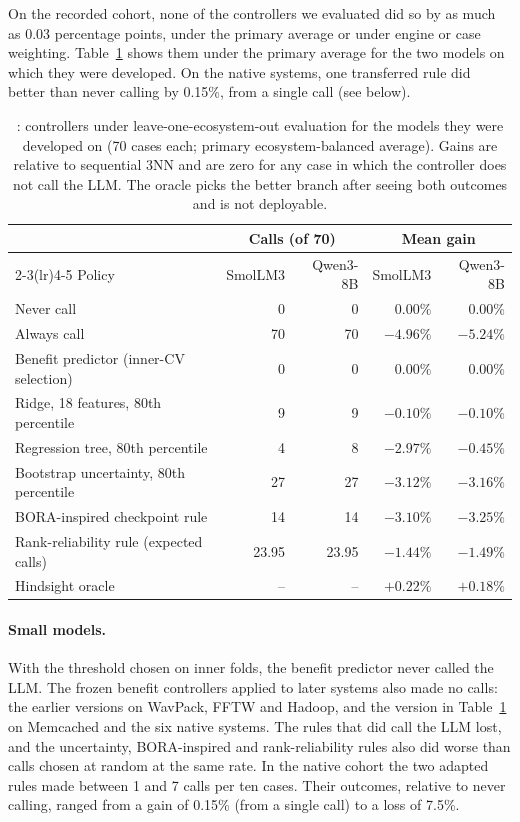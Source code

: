 On the recorded cohort, none of the controllers we evaluated did so by as much as 0.03 percentage points, under the primary average or under engine or case weighting. Table~\ref{tab:rq4} shows them under the primary average for the two models on which they were developed. On the native systems, one transferred rule did better than never calling by 0.15\%, from a single call (see below).

\begin{table}[t]
\centering
\caption{: controllers under leave-one-ecosystem-out evaluation for the models they were developed on (70 cases each; primary ecosystem-balanced average). Gains are relative to sequential 3NN and are zero for any case in which the controller does not call the LLM. The oracle picks the better branch after seeing both outcomes and is not deployable.}
\label{tab:rq4}
\small
\begin{tabular}{lrrrr}
\toprule
 & \multicolumn{2}{c}{Calls (of 70)} & \multicolumn{2}{c}{Mean gain} \\
\cmidrule(lr){2-3}\cmidrule(lr){4-5}
Policy & SmolLM3 & Qwen3-8B & SmolLM3 & Qwen3-8B \\
\midrule
Never call & 0 & 0 & $0.00\%$ & $0.00\%$ \\
Always call & 70 & 70 & $-4.96\%$ & $-5.24\%$ \\
Benefit predictor (inner-CV selection) & 0 & 0 & $0.00\%$ & $0.00\%$ \\
Ridge, 18 features, 80th percentile & 9 & 9 & $-0.10\%$ & $-0.10\%$ \\
Regression tree, 80th percentile & 4 & 8 & $-2.97\%$ & $-0.45\%$ \\
Bootstrap uncertainty, 80th percentile & 27 & 27 & $-3.12\%$ & $-3.16\%$ \\
BORA-inspired checkpoint rule & 14 & 14 & $-3.10\%$ & $-3.25\%$ \\
Rank-reliability rule (expected calls) & 23.95 & 23.95 & $-1.44\%$ & $-1.49\%$ \\
\midrule
Hindsight oracle & -- & -- & $+0.22\%$ & $+0.18\%$ \\
\bottomrule
\end{tabular}
\end{table}

\paragraph{Small models.} With the threshold chosen on inner folds, the benefit predictor never called the LLM. The frozen benefit controllers applied to later systems also made no calls: the earlier versions on WavPack, FFTW and Hadoop, and the version in Table~\ref{tab:rq4} on Memcached and the six native systems. The rules that did call the LLM lost, and the uncertainty, BORA-inspired and rank-reliability rules also did worse than calls chosen at random at the same rate. In the native cohort the two adapted rules made between 1 and 7 calls per ten cases. Their outcomes, relative to never calling, ranged from a gain of 0.15\% (from a single call) to a loss of 7.5\%.

